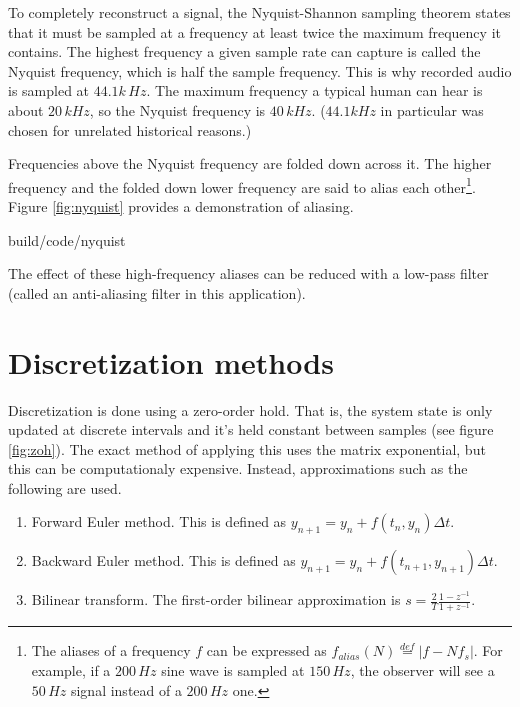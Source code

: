 To completely reconstruct a signal, the Nyquist-Shannon sampling theorem states
that it must be sampled at a frequency at least twice the maximum frequency it
contains. The highest frequency a given sample rate can capture is called the
Nyquist frequency, which is half the sample frequency. This is why recorded
audio is sampled at $44.1k\,Hz$. The maximum frequency a typical human can hear
is about $20\,kHz$, so the Nyquist frequency is $40\,kHz$. ($44.1kHz$ in
particular was chosen for unrelated historical reasons.)

Frequencies above the Nyquist frequency are folded down across it. The higher
frequency and the folded down lower frequency are said to alias each
other\footnote{The aliases of a frequency $f$ can be expressed as
$f_{alias}(N) \stackrel{def}{=} |f - Nf_s|$. For example, if a $200\,Hz$ sine
wave is sampled at $150\,Hz$, the observer will see a $50\,Hz$ signal instead of
a $200\,Hz$ one.}. Figure \ref{fig:nyquist} provides a demonstration of
aliasing.

\begin{svg}{build/code/nyquist}
  \caption{The samples of two sine waves can be identical when at least one of
    them is at a frequency above half the sample rate. In this case, the $2\,Hz$
    sine wave is above the Nyquist frequency $1.5\,Hz$.}
  \label{fig:nyquist}
\end{svg}

The effect of these high-frequency aliases can be reduced with a low-pass filter
(called an anti-aliasing filter in this application).

\section{Discretization methods} \label{sec:discretization_methods}

Discretization is done using a zero-order hold. That is, the system state is
only updated at discrete intervals and it's held constant between samples (see
figure \ref{fig:zoh}). The exact method of applying this uses the matrix
exponential, but this can be computationaly expensive. Instead, approximations
such as the following are used.

\begin{enumerate}
  \item Forward Euler method. This is defined as
    $y_{n+1} = y_n + f(t_n, y_n) \Delta t$.
  \item Backward Euler method. This is defined as
    $y_{n+1} = y_n + f(t_{n+1}, y_{n+1}) \Delta t$.
  \item Bilinear transform. The first-order bilinear approximation is
    $s = \frac{2}{T} \frac{1 - z^{-1}}{1 + z^{-1}}$.
\end{enumerate}

